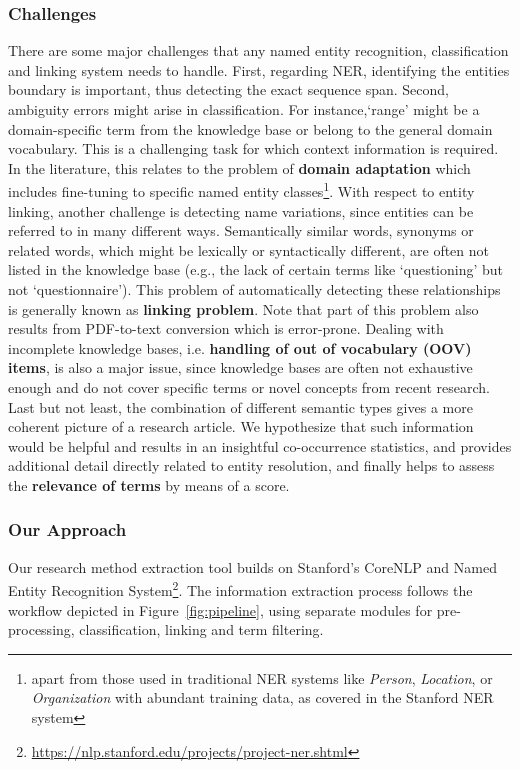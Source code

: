 \subsubsection{Challenges}
There are some major challenges that any named entity recognition, classification and linking system needs to handle.
First, regarding NER, identifying the entities boundary is important, thus detecting the exact sequence span. 
Second, ambiguity errors might arise in classification. For instance,`range' might be a domain-specific term from the knowledge base or belong to the general domain vocabulary. This is a challenging task for which context information is required. 
In the literature, this relates to the problem of \textbf{domain adaptation} which includes fine-tuning to specific named entity classes\footnote{apart from those used in traditional NER systems like \textit{Person}, \textit{Location}, or \textit{Organization} with abundant training data, as covered in the Stanford NER system\cite{finkel2005incorporating}}.
With respect to entity linking, another challenge is detecting name variations, since entities can be referred to in many different ways.
Semantically similar words, synonyms or related words, which might be lexically or syntactically different, are often not listed in the knowledge base 
(e.g., the lack of certain terms like `questioning' but not `questionnaire'). This problem of automatically detecting these relationships is generally known as \textbf{linking problem}. 
Note that part of this problem also results from PDF-to-text conversion which is error-prone. 
Dealing with incomplete knowledge bases, i.e. \textbf{handling of out of vocabulary (OOV) items}, is also a major issue, since 
knowledge bases are often not exhaustive enough and do not cover specific terms or novel concepts from recent research.
Last but not least, the combination of different semantic types gives a more coherent picture of a research article. We hypothesize that such information would be helpful and results in an insightful co-occurrence statistics, and provides additional detail directly related to entity resolution, and finally helps to assess the \textbf{relevance of terms} by means of a score.

 
\subsubsection{Our Approach} 
Our research method extraction tool builds on Stanford’s CoreNLP and Named Entity Recognition System\footnote{\url{https://nlp.stanford.edu/projects/project-ner.shtml}}. 
The information extraction process follows the workflow depicted in Figure~\ref{fig:pipeline}, using separate modules for pre-processing, classification, linking and term filtering.

